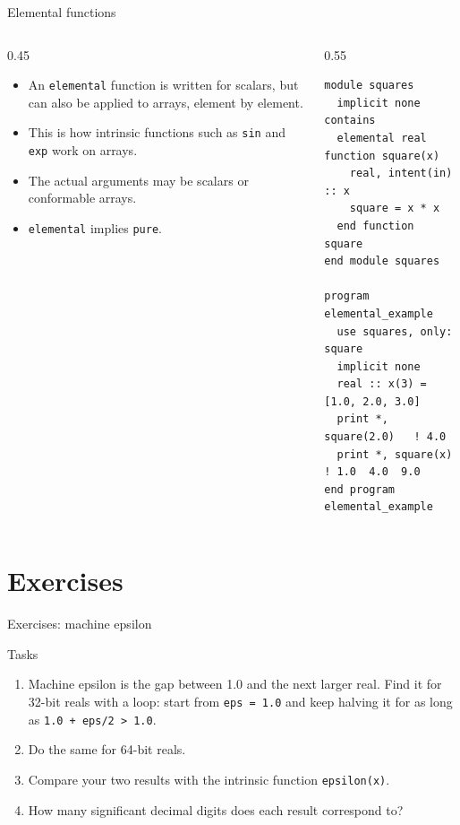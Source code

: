 \begin{frame}[fragile]{Elemental functions}
  \begin{columns}[T]
    \begin{column}{0.45\textwidth}
      \begin{itemize}
        \item An \texttt{elemental} function is written for scalars, but can also be applied to arrays, element by element.
        \item This is how intrinsic functions such as \texttt{sin} and \texttt{exp} work on arrays.
        \item The actual arguments may be scalars or conformable arrays.
        \item \texttt{elemental} implies \texttt{pure}.
      \end{itemize}
    \end{column}

    \begin{column}{0.55\textwidth}
      \begin{lstlisting}
module squares
  implicit none
contains
  elemental real function square(x)
    real, intent(in) :: x
    square = x * x
  end function square
end module squares

program elemental_example
  use squares, only: square
  implicit none
  real :: x(3) = [1.0, 2.0, 3.0]
  print *, square(2.0)   ! 4.0
  print *, square(x)     ! 1.0  4.0  9.0
end program elemental_example
      \end{lstlisting}
    \end{column}
  \end{columns}
\end{frame}


\section{Exercises}

\begin{frame}{Exercises: machine epsilon}
  \begin{block}{Tasks}
    \begin{enumerate}
      \item Machine epsilon is the gap between 1.0 and the next larger real. Find it for 32-bit reals with a loop: start from \texttt{eps = 1.0} and keep halving it for as long as \mbox{\texttt{1.0 + eps/2 > 1.0}}.
      \item Do the same for 64-bit reals.
      \item Compare your two results with the intrinsic function \texttt{epsilon(x)}.
      \item How many significant decimal digits does each result correspond to?
    \end{enumerate}
  \end{block}
\end{frame}


